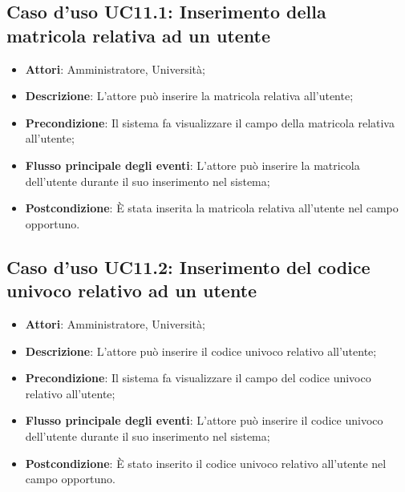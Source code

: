 \subsection{Caso d'uso \texorpdfstring{UC11.1}{UC11.1}: Inserimento della matricola relativa ad un utente}
\begin{itemize}
	\item \textbf{Attori}: Amministratore, Università;
	\item \textbf{Descrizione}: L'attore può inserire la matricola relativa all'utente;
	\item \textbf{Precondizione}: Il sistema fa visualizzare il campo della matricola relativa all'utente;
	\item \textbf{Flusso principale degli eventi}: L'attore può inserire la matricola dell'utente durante il suo inserimento nel sistema;
	\item \textbf{Postcondizione}: È stata inserita la matricola relativa all'utente nel campo opportuno.
\end{itemize}
\subsection{Caso d'uso \texorpdfstring{UC11.2}{UC11.2}: Inserimento del codice univoco relativo ad un utente}
\begin{itemize}
	\item \textbf{Attori}: Amministratore, Università;
	\item \textbf{Descrizione}: L'attore può inserire il codice univoco relativo all'utente;
	\item \textbf{Precondizione}: Il sistema fa visualizzare il campo del codice univoco relativo all'utente;
	
	\item \textbf{Flusso principale degli eventi}: L'attore può inserire il codice univoco dell'utente durante il suo inserimento nel sistema;
	\item \textbf{Postcondizione}: È stato inserito il codice univoco relativo all'utente nel campo opportuno.
	
\end{itemize}
